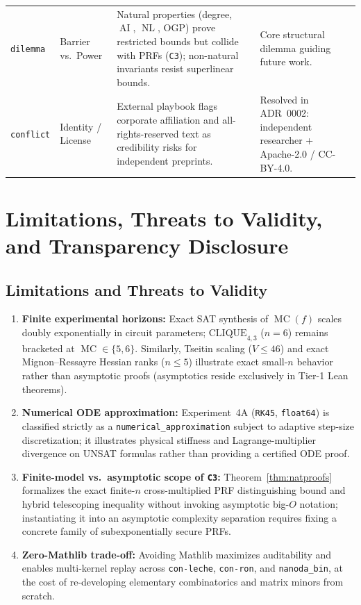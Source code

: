 \documentclass[11pt,reqno]{amsart}
\newcommand{\code}[1]{\texttt{\nolinkurl{#1}}}
\theoremstyle{definition}
\newcommand{\MC}{\operatorname{MC}}
\newcommand{\AI}{\operatorname{AI}}
\newcommand{\NL}{\operatorname{NL}}
\begin{document}
\begin{table}[htbp]
\begin{tabularx}{\textwidth}{@{}l>{\raggedright\arraybackslash}p{2.75cm}Y{1.32}Y{0.68}@{}}
\addlinespace[2pt]
\texttt{dilemma} & Barrier vs.\ Power & Natural properties (degree, $\AI$, $\NL$, OGP) prove restricted bounds but collide with PRFs (\texttt{C3}); non-natural invariants resist superlinear bounds. & Core structural dilemma guiding future work. \\
\addlinespace[2pt]
\texttt{conflict} & Identity / License & External playbook flags corporate affiliation and all-rights-reserved text as credibility risks for independent preprints. & Resolved in ADR~0002: independent researcher + Apache-2.0 / CC-BY-4.0. \\
\bottomrule
\end{tabularx}
\end{table}

\FloatBarrier

\section{Limitations, Threats to Validity, and Transparency Disclosure}
\label{sec:disclosure}

\subsection{Limitations and Threats to Validity}
\begin{enumerate}[leftmargin=1.6em]
\item \textbf{Finite experimental horizons:} Exact SAT synthesis of $\MC(f)$ scales
      doubly exponentially in circuit parameters; $\mathrm{CLIQUE}_{4,3}$ ($n=6$) remains
      bracketed at $\MC \in \{5,6\}$. Similarly, Tseitin scaling ($V \le 46$) and exact
      Mignon--Ressayre Hessian ranks ($n \le 5$) illustrate exact small-$n$ behavior
      rather than asymptotic proofs (asymptotics reside exclusively in Tier-1 Lean
      theorems).
\item \textbf{Numerical ODE approximation:} Experiment~4A (\texttt{RK45}, \texttt{float64})
      is classified strictly as a \code{numerical_approximation} subject to adaptive
      step-size discretization; it illustrates physical stiffness and Lagrange-multiplier
      divergence on UNSAT formulas rather than providing a certified ODE proof.
\item \textbf{Finite-model vs.\ asymptotic scope of \texttt{C3}:} Theorem~\ref{thm:natproofs}
      formalizes the exact finite-$n$ cross-multiplied PRF distinguishing bound and hybrid
      telescoping inequality without invoking asymptotic big-$O$ notation; instantiating
      it into an asymptotic complexity separation requires fixing a concrete family of
      subexponentially secure PRFs.
\item \textbf{Zero-Mathlib trade-off:} Avoiding Mathlib maximizes auditability and
      enables multi-kernel replay across \texttt{con-leche}, \texttt{con-ron}, and
      \code{nanoda_bin}, at the cost of re-developing elementary combinatorics and
      matrix minors from scratch.
\end{enumerate}
\end{document}
